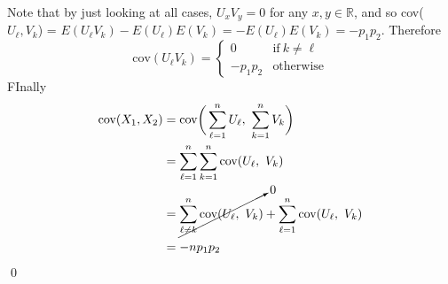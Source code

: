 \documentclass{article}
\newcommand{\R}{\mathbb{R}}
\begin{document}
Note that by just looking at all cases, $U_{x}V_{y} = 0$ for any $x, y \in \R$, and so cov($U_{\ell}, V_{k}$) = $E(U_{\ell}V_{k}) - E(U_{\ell})E(V_{k}) = - E(U_{\ell})E(V_{k}) = -p_{1}p_{2}$. Therefore
\[
\text{cov}(U_{\ell}V_{k}) =
\begin{cases}
	0 &\text{if}\ k \neq \ell\\
	-p_{1}p_{2} &\text{otherwise}
\end{cases}
\]
FInally
\begin{align*}
	\text{cov}(X_{1}, X_{2}) &= \text{cov}\bigg(\sum_{\ell=1}^{n} U_{\ell},\ \sum_{k=1}^{n} V_{k}\bigg)\\
						&= \sum_{\ell =1}^{n} \sum_{k=1}^{n} \text{cov}(U_{\ell},\ V_{k})\\
						&= \cancelto{0}{\sum_{\ell \neq k}^{n} \text{cov}(U_{\ell},\ V_{k})} + \sum_{\ell=1}^{n}\text{cov}(U_{\ell},\ V_{k})\\
						&= -np_{1}p_{2}
\end{align*}
\qed
\end{document}
